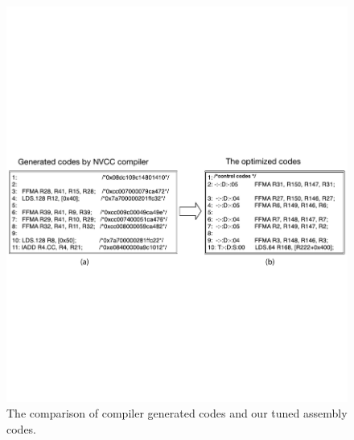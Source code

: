 \documentclass{sig-alternate-05-2015}
\begin{document}
\begin{figure}[htbp]
\begin{center}
\includegraphics[scale=0.6]{assemlycode}
    \caption{The comparison of compiler generated codes and our tuned assembly codes.}
\label{fig:assemblycode}
\end{center}
\end{figure}
\end{document}
